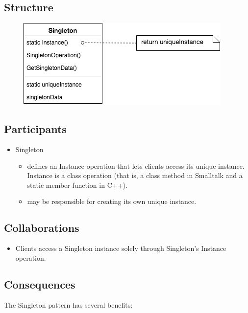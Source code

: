 \subsection*{Structure}

\begin{figure}[H]
\centering
\includegraphics[scale=0.6]{diagrams/singleton.png}
\end{figure}

\subsection*{Participants}

\begin{itemize}
    \item Singleton
    \begin{itemize}
        \item defines an Instance operation that lets clients access its unique instance. Instance is a class operation (that is, a class method in Smalltalk and a static member function in C++).
        \item may be responsible for creating its own unique instance.
    \end{itemize}
\end{itemize}

\subsection*{Collaborations}

\begin{itemize}
    \item Clients access a Singleton instance solely through Singleton's Instance operation.
\end{itemize}

\subsection*{Consequences}

The Singleton pattern has several benefits:

